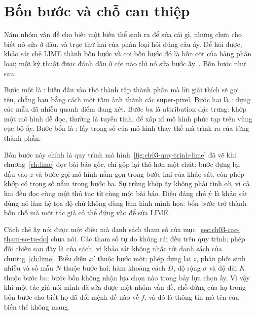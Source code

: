 \section{Bốn bước và chỗ can thiệp}
\label{sec:ch10-bon-buoc}

%
Năm nhóm vấn đề cho biết một biến thể sinh ra để sửa cái gì, nhưng chưa cho biết
nó sửa ở đâu, và trục thứ hai của phân loại hỏi đúng câu ấy. Để hỏi được, khảo
sát chẻ LIME thành bốn bước và coi bốn bước đó là bốn cột của bảng phân loại;
một kỹ thuật được đánh dấu ở cột nào thì nó sửa bước
ấy~\autocite{p22whichlime}. Bốn bước như sau.

%
%
Bước một là : biến đầu vào thô thành tập
thành phần mà lời giải thích sẽ gọi tên, chẳng hạn bằng cách
 một tấm ảnh thành các super-pixel. Bước hai là
: dựng các mẫu đã nhiễu quanh điểm đang xét. Bước
ba là attribution đặc trưng: khớp một mô hình dễ đọc, thường là tuyến
tính, để xấp xỉ mô hình phức tạp trên vùng cục bộ ấy. Bước bốn là
: lấy trọng số của mô
hình thay thế mà trình ra  của từng thành phần.

Bốn bước này chính là quy trình mà hình~\ref{fig:ch03-quy-trinh-lime} đã vẽ khi
chương~\ref{ch:lime} đọc bài báo gốc, chỉ gộp lại thô hơn một chút: bước dựng
lại đầu vào $z$ và bước gọi mô hình  nằm gọn trong bước
hai của khảo sát,
còn phép khớp có trọng số nằm trong bước ba. Sự trùng khớp ấy không phải tình
cờ, vì cả hai đều đọc cùng một thủ tục từ cùng một bài báo. Điều đáng chú ý là
khảo sát dùng nó làm hệ tọa độ chứ không dùng làm hình minh họa: bốn bước trở
thành bốn chỗ mà một tác giả có thể đứng vào để sửa LIME.

Cách chẻ ấy nói được một điều mà danh sách tham số của
mục~\ref{sec:ch03-cac-tham-so-tu-do} chưa nói. Các tham số tự do không rải đều
trên quy trình; phép đối chiếu sau đây là của sách, vì khảo sát không nhắc tới
danh sách của chương~\ref{ch:lime}. Biểu diễn $x'$ thuộc bước một; phép dựng lại $z$, phân phối sinh
nhiễu và số mẫu $N$ thuộc bước hai; hàm khoảng cách $D$, độ rộng $\sigma$ và độ
dài $K$ thuộc bước ba; bước bốn không nhận lựa chọn nào trong bảy lựa chọn ấy. Vì vậy khi một
tác giả nói mình đã sửa được một nhóm vấn đề, chỗ đứng của họ trong bốn bước cho
biết họ đã đổi mệnh đề nào về $f$, và đó là thông tin mà tên của biến thể không
mang.

